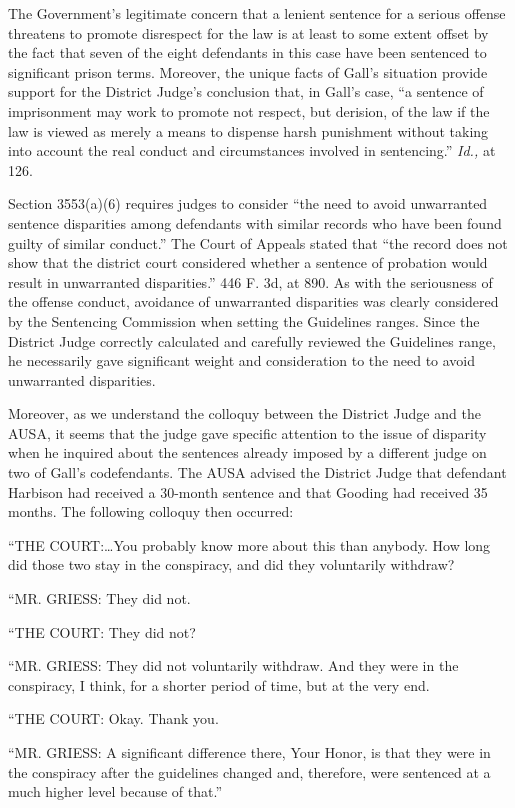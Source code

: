   The Government's legitimate concern that a lenient sentence for
a serious offense threatens to promote disrespect for the law is
at least to some extent offset by the fact that seven of the eight
defendants in this case have been sentenced to significant prison terms.
Moreover, the unique facts of Gall's situation provide support for
the District Judge's conclusion that, in Gall's case, ``a sentence
of imprisonment may work to promote not respect, but derision, of the
law if the law is viewed as merely a means to dispense harsh punishment
without taking into account the real conduct and circumstances involved
in sentencing.'' \emph{Id.,} at 126.

  Section 3553(a)(6) requires judges to consider ``the need to avoid
unwarranted sentence disparities among defendants with similar records
who have been found guilty of similar conduct.'' The Court of Appeals
stated that ``the record does not show that the district court
considered whether a sentence of probation would result in unwarranted
disparities.'' 446 F. 3d, at 890. As with the seriousness of the
offense conduct, avoidance of unwarranted disparities was clearly
considered by the Sentencing Commission when setting the Guidelines
ranges. Since the District Judge correctly calculated and carefully
reviewed the Guidelines range, he necessarily gave significant weight
and consideration to the need to avoid unwarranted disparities.

  Moreover, as we understand the colloquy between the District Judge and
the AUSA, it seems that the judge gave specific attention to the issue
of disparity when he inquired about the sentences already imposed by a
different judge on two of Gall's codefendants. The AUSA advised the
District \newpage  Judge that defendant Harbison had received a 30-month
sentence and that Gooding had received 35 months. The following colloquy
then occurred:

      ``THE COURT:\dots You probably know more about this than
    anybody. How long did those two stay in the conspiracy, and did they
    voluntarily withdraw?

      ``MR. GRIESS: They did not.

      ``THE COURT: They did not?

      ``MR. GRIESS: They did not voluntarily withdraw. And they were in
    the conspiracy, I think, for a shorter period of time, but at the
    very end.

      ``THE COURT: Okay. Thank you.

      ``MR. GRIESS: A significant difference there, Your Honor, is
    that they were in the conspiracy after the guidelines changed and,
    therefore, were sentenced at a much higher level because of that.''

